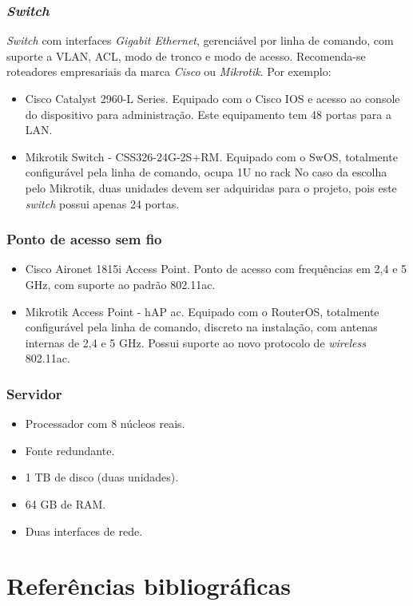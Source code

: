 \documentclass[	DIV=calc,%
							paper=a4,%
							fontsize=12pt,%
							onecolumn]{scrartcl}	 					%
\begin{document}
\subsubsection{\textit{Switch}}

\textit{Switch} com interfaces \textit{Gigabit Ethernet}, gerenciável por linha de comando, com suporte a VLAN, ACL, modo de tronco e modo de acesso. Recomenda-se roteadores empresariais da marca \textit{Cisco} ou \textit{Mikrotik}. Por exemplo:

\begin{itemize}
	\item{Cisco Catalyst 2960-L Series}. Equipado com o Cisco IOS e acesso ao console do dispositivo para administração. Este equipamento tem 48 portas para a LAN.
	\item{Mikrotik Switch - CSS326-24G-2S+RM}. Equipado com o SwOS, totalmente configurável pela linha de comando, ocupa 1U no rack No caso da escolha pelo Mikrotik, duas unidades devem ser adquiridas para o projeto, pois este \textit{switch} possui apenas 24 portas. 
\end{itemize}

\subsubsection{Ponto de acesso sem fio}
\begin{itemize}
	\item{Cisco Aironet 1815i Access Point}. Ponto de acesso com frequências em 2,4 e 5 GHz, com suporte ao padrão 802.11ac.
	\item{Mikrotik Access Point - hAP ac}. Equipado com o RouterOS, totalmente configurável pela linha de comando, discreto  na instalação, com antenas internas de 2,4 e 5 GHz. Possui suporte ao novo protocolo de \textit{wireless} 802.11ac.  
\end{itemize}

\subsubsection{Servidor}

\begin{itemize}
	\item Processador com 8 núcleos reais.
	\item Fonte redundante.
	\item 1 TB de disco (duas unidades).
	\item 64 GB de RAM.
	\item Duas interfaces de rede.
\end{itemize}

\pagebreak
\section{Referências bibliográficas}

\renewcommand\refname{} %

  
\end{document}
